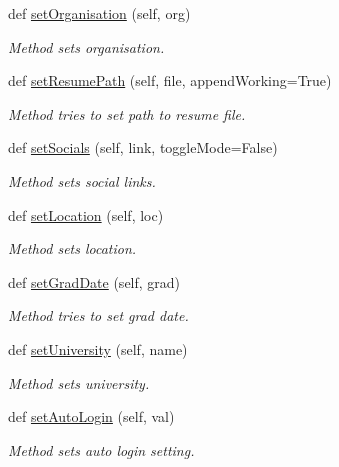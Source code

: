 \begin{DoxyCompactItemize}
def \hyperlink{classuserProfile_1_1userProfile_a240b062efefc77fb5137306709aef5ed}{set\+Organisation} (self, org)
\begin{DoxyCompactList}\small\item\em Method sets organisation. \end{DoxyCompactList}\item 
def \hyperlink{classuserProfile_1_1userProfile_ae7ad036942595e2ae9c1247d2c49a63b}{set\+Resume\+Path} (self, file, append\+Working=True)
\begin{DoxyCompactList}\small\item\em Method tries to set path to resume file. \end{DoxyCompactList}\item 
def \hyperlink{classuserProfile_1_1userProfile_a2a10347741d3e396e48d6aa1bb49cecb}{set\+Socials} (self, link, toggle\+Mode=False)
\begin{DoxyCompactList}\small\item\em Method sets social links. \end{DoxyCompactList}\item 
def \hyperlink{classuserProfile_1_1userProfile_ad8b26311a1d9adf8b7b29c7d7ab73358}{set\+Location} (self, loc)
\begin{DoxyCompactList}\small\item\em Method sets location. \end{DoxyCompactList}\item 
def \hyperlink{classuserProfile_1_1userProfile_a49e06c1b0a539a79d66108e096fc46d6}{set\+Grad\+Date} (self, grad)
\begin{DoxyCompactList}\small\item\em Method tries to set grad date. \end{DoxyCompactList}\item 
def \hyperlink{classuserProfile_1_1userProfile_a33423b70af186c953dc94e302cc717d3}{set\+University} (self, name)
\begin{DoxyCompactList}\small\item\em Method sets university. \end{DoxyCompactList}\item 
def \hyperlink{classuserProfile_1_1userProfile_a069b4dcc551295eceac4eaef147d59f3}{set\+Auto\+Login} (self, val)
\begin{DoxyCompactList}\small\item\em Method sets auto login setting. \end{DoxyCompactList}\end{DoxyCompactItemize}


